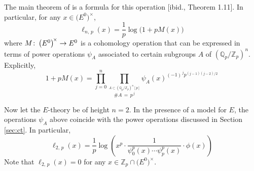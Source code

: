 \documentclass{gtpart}
\theoremstyle{definition}
\theoremstyle{remark}
\def\co{\colon\thinspace}
\newcommand{\mb}[1]{\mathbb{#1}}
\newcommand{\BQ}{{\mb Q}}
\newcommand{\BZ}{{\mb Z}}
\renewcommand{\=}{\approx}
\renewcommand{\-}{\sim}
\numberwithin{equation}{section}
\numberwithin{thm}{section}
\begin{document}
The main theorem of \cite{log} is a formula for this operation [ibid., Theorem 1.11].  
In particular, for any $x \in \big( E^0 \big)^{\!\times}$, 
\[
 \ell_{n,\,p}(x) = \frac{1}{p} \log\big(1 + p M(x)\big) 
\]
where $M \co \big( E^0 \big)^{\!\times} \to E^0$ is a cohomology operation 
that can be expressed in terms of power operations $\psi_A$ associated to certain subgroups $A$ of $(\BQ_p/\BZ_p)^n$.  
Explicitly, 
\[
 1 + p M(x) = \prod_{j=0}^n \prod_{\stackrel{\scriptstyle A \subset (\BQ_p/\BZ_p)^n [p]}{\#A \, = \, p^{\,j}}} \psi_A(x)^{(-1)^{\,j} p^{(j-1)(j-2)/2}} 
\]

Now let the $E$-theory be of height $n = 2$.  
In the presence of a model for $E$, the operations $\psi_A$ above coincide with the power operations discussed in Section \ref{sec:ct}.  
In particular, 
\begin{equation}
 \label{l2p}
 \ell_{2,\,p}(x) = \frac{1}{p} \log \left( x^p \cdot \frac{1}{\psi^p_0(x) \cdots \psi^p_p(x)} \cdot \phi(x) \right) 
\end{equation}
Note that $\ell_{2,\,p}(x) = 0$ for any $x \in \BZ_p \cap \big( E^0 \big)^{\!\times}$.  
\end{document}
